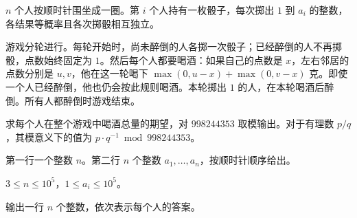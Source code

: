 \Legend
$n$ 个人按顺时针围坐成一圈。第 $i$ 个人持有一枚骰子，每次掷出 $1$ 到 $a_i$ 的整数，各结果等概率且各次掷骰相互独立。

游戏分轮进行。每轮开始时，尚未醉倒的人各掷一次骰子；已经醉倒的人不再掷骰，点数始终固定为 $1$。然后每个人都要喝酒：如果自己的点数是 $x$，左右邻居的点数分别是 $u,v$，他在这一轮喝下 $\max(0,u-x)+\max(0,v-x)$ 克。即使一个人已经醉倒，他也仍会按此规则喝酒。本轮掷出 $1$ 的人，在本轮喝酒后醉倒。所有人都醉倒时游戏结束。

求每个人在整个游戏中喝酒总量的期望，对 $998244353$ 取模输出。对于有理数 $p/q$，其模意义下的值为 $p\cdot q^{-1}\bmod 998244353$。

\Input

第一行一个整数 $n$。第二行 $n$ 个整数 $a_1,\ldots,a_n$，按顺时针顺序给出。

$3\le n\le 10^5$，$1\le a_i\le 10^5$。

\Output

输出一行 $n$ 个整数，依次表示每个人的答案。

\Examples

\begin{example}
\end{example}
